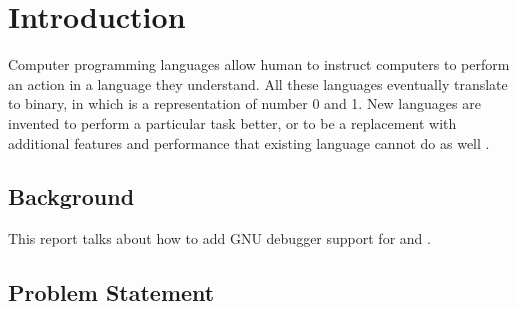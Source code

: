 \chapter{Introduction}

Computer programming languages allow human to instruct computers to perform an
action in a language they understand. All these languages eventually translate
to binary, in which is a representation of number 0 and 1. New languages are
invented to perform a particular task better, or to be a replacement with
additional features and performance that existing language cannot do as well
\cite{Reference1}.

\section{Background}
This report talks about how to add GNU debugger support for \uCPP and \CFA.

\section{Problem Statement}
